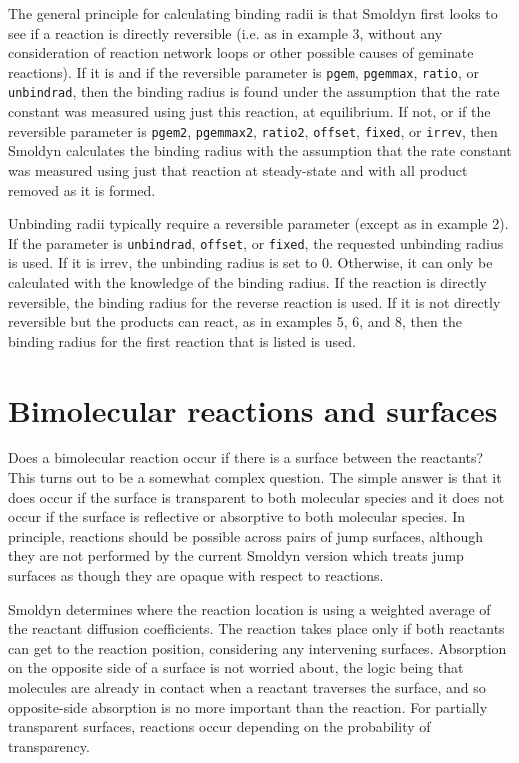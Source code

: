 \documentclass {book}
\newcommand {\ttt} {\texttt}
\begin{document}
The general principle for calculating binding radii is that Smoldyn first looks to see if a reaction is directly reversible (i.e. as in example 3, without any consideration of reaction network loops or other possible causes of geminate reactions). If it is and if the reversible parameter is \ttt{pgem}, \ttt{pgemmax}, \ttt{ratio}, or \ttt{unbindrad}, then the binding radius is found under the assumption that the rate constant was measured using just this reaction, at equilibrium. If not, or if the reversible parameter is \ttt{pgem2}, \ttt{pgemmax2}, \ttt{ratio2}, \ttt{offset}, \ttt{fixed}, or \ttt{irrev}, then Smoldyn calculates the binding radius with the assumption that the rate constant was measured using just that reaction at steady-state and with all product removed as it is formed.

Unbinding radii typically require a reversible parameter (except as in example 2). If the parameter is \ttt{unbindrad}, \ttt{offset}, or \ttt{fixed}, the requested unbinding radius is used. If it is irrev, the unbinding radius is set to 0. Otherwise, it can only be calculated with the knowledge of the binding radius. If the reaction is directly reversible, the binding radius for the reverse reaction is used. If it is not directly reversible but the products can react, as in examples 5, 6, and 8, then the binding radius for the first reaction that is listed is used.

\section{Bimolecular reactions and surfaces}

Does a bimolecular reaction occur if there is a surface between the reactants? This turns out to be a somewhat complex question. The simple answer is that it does occur if the surface is transparent to both molecular species and it does not occur if the surface is reflective or absorptive to both molecular species. In principle, reactions should be possible across pairs of jump surfaces, although they are not performed by the current Smoldyn version which treats jump surfaces as though they are opaque with respect to reactions.

Smoldyn determines where the reaction location is using a weighted average of the reactant diffusion coefficients. The reaction takes place only if both reactants can get to the reaction position, considering any intervening surfaces. Absorption on the opposite side of a surface is not worried about, the logic being that molecules are already in contact when a reactant traverses the surface, and so opposite-side absorption is no more important than the reaction. For partially transparent surfaces, reactions occur depending on the probability of transparency.
\end{document}
